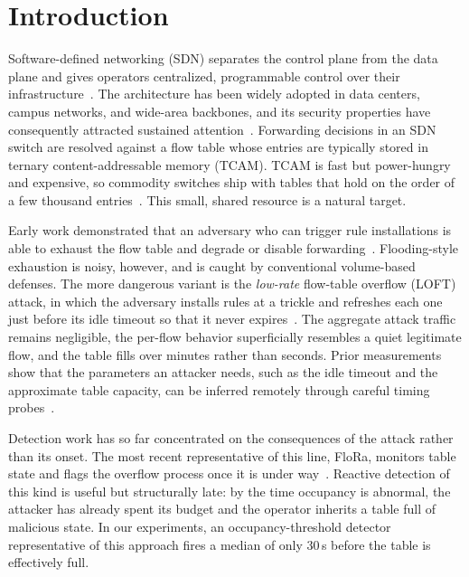 \documentclass[conference]{IEEEtran}
\begin{document}
\section{Introduction}
Software-defined networking (SDN) separates the control plane from the data
plane and gives operators centralized, programmable control over their
infrastructure~\cite{mckeown2008openflow}. The architecture has been widely
adopted in data centers, campus networks, and wide-area backbones, and its
security properties have consequently attracted sustained
attention~\cite{kreutz2015sdn}. Forwarding decisions in an SDN switch are
resolved against a flow table whose entries are typically stored in ternary
content-addressable memory (TCAM). TCAM is fast but power-hungry and expensive,
so commodity switches ship with tables that hold on the order of a few thousand
entries~\cite{curtis2011devoflow}. This small, shared resource is a natural
target.

Early work demonstrated that an adversary who can trigger rule installations is
able to exhaust the flow table and degrade or disable
forwarding~\cite{shin2013attacking}. Flooding-style exhaustion is noisy,
however, and is caught by conventional volume-based defenses. The more dangerous
variant is the \emph{low-rate} flow-table overflow (LOFT) attack, in which the
adversary installs rules at a trickle and refreshes each one just before its
idle timeout so that it never expires~\cite{cao2017loft}. The aggregate attack
traffic remains negligible, the per-flow behavior superficially resembles a
quiet legitimate flow, and the table fills over minutes rather than seconds.
Prior measurements show that the parameters an attacker needs, such as the idle
timeout and the approximate table capacity, can be inferred remotely through
careful timing probes~\cite{leng2015inference}.

Detection work has so far concentrated on the consequences of the attack rather
than its onset. The most recent representative of this line, FloRa, monitors
table state and flags the overflow process once it is under
way~\cite{flora2024}. Reactive detection of this kind is useful but
structurally late: by the time occupancy is abnormal, the attacker has already
spent its budget and the operator inherits a table full of malicious state. In
our experiments, an occupancy-threshold detector representative of this approach
fires a median of only 30\,s before the table is effectively full.
\end{document}
